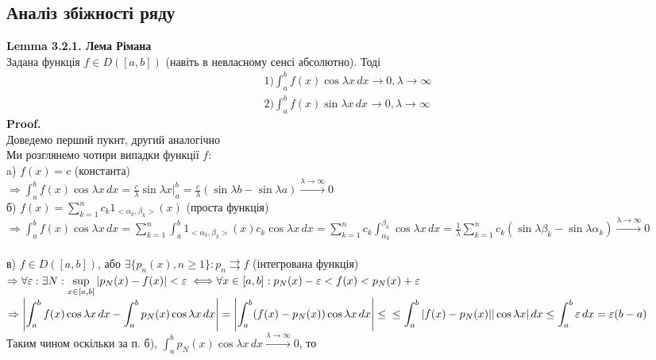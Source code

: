 \documentclass{math_library}
\begin{document}
\subsection{Аналіз збіжності ряду}
\textbf{Lemma 3.2.1. Лема Рімана}\\ Задана функція $f \in D([a,b])$ (навіть в невласному сенсі абсолютно). Тоді
\begin{align*}
1) \int_a^b f(x) \cos \lambda x \,dx \to 0, \lambda \to \infty \\
2) \int_a^b f(x) \sin \lambda x \,dx \to 0, \lambda \to \infty
\end{align*}
\textbf{Proof.}\\
Доведемо перший пукнт, другий аналогічно\\
Ми розглянемо чотири випадки функції $f$:\\
a) $f(x) = c$ (константа)\\
 $\Rightarrow \displaystyle \int_a^b f(x) \cos \lambda x \,dx = \frac{c}{\lambda} \sin \lambda x \Big|_{a}^b = \frac{c}{\lambda} \left(\sin \lambda b - \sin \lambda a \right) \overset{\lambda \to \infty}{\to} 0$
\bigskip \\
б) $\displaystyle f(x) = \sum_{k=1}^n c_k 1_{<\alpha_k, \beta_k>} (x)$ (проста функція)\\
$\Rightarrow \displaystyle \int_a^b f(x) \cos \lambda x \,dx = \sum_{k=1}^n \int_a^b 1_{<\alpha_k, \beta_k>} (x) c_k \cos \lambda x \,dx = \sum_{k=1}^n c_k \int_{\alpha_k}^{\beta_k} \cos \lambda x \,dx = \frac{1}{\lambda} \sum_{k=1}^n c_k (\sin \lambda \beta_k - \sin \lambda \alpha_k) \overset{\lambda \to \infty}{\to} 0$\\
\bigskip \\
в) $f \in D([a,b])$, або $\exists \{p_n(x), n \geq 1\}: p_n \rightrightarrows f$ (інтегрована функція)\\
$\Rightarrow \displaystyle \forall \varepsilon: \exists N: \sup_{x \in [a,b]} |p_N(x) - f(x)| < \varepsilon \iff \\ \forall x \in [a,b]: p_N(x) - \varepsilon <f(x) < p_N(x) + \varepsilon$\\
$\Rightarrow \displaystyle \abs{\int_a^b f(x) \cos \lambda x \,dx - \int_a^b p_N(x) \cos \lambda x \,dx} = \abs{\int_a^b (f(x) - p_N(x)) \cos \lambda x \,dx} \leq \\ \leq \int_a^b |f(x)-p_N(x)| |\cos \lambda x| \,dx \leq \int_a^b \varepsilon \,dx = \varepsilon(b-a)$\\
Таким чином оскільки за п. б), $\displaystyle \int_a^b p_N(x) \cos \lambda x \,dx \overset{\lambda \to \infty}{\to} 0$, то\\
\end{document}
